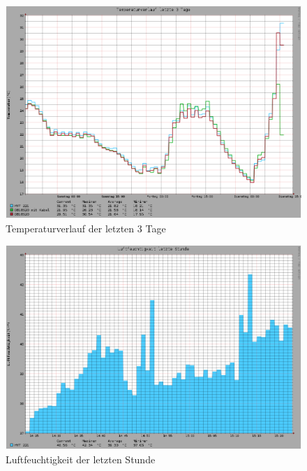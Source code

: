 \begin{figure}[!h] 
  \centering
     \includegraphics[scale=.3]{BilderAllgemein/Bilder/Temperatur3Tage.png}
  \caption{Temperaturverlauf der letzten 3 Tage}
\end{figure}

\begin{figure}[!h] 
  \centering
     \includegraphics[scale=.3]{BilderAllgemein/Bilder/FeuchtigkeitStunde.png}
  \caption{Luftfeuchtigkeit der letzten Stunde}
\end{figure}\newpage

